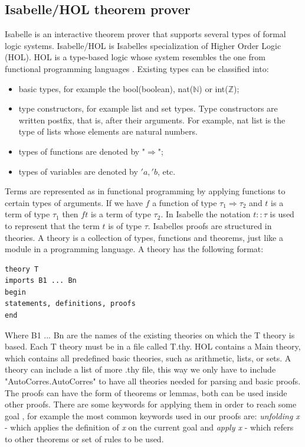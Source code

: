 \documentclass[conference]{IEEEtran}
\begin{document}
\subsection{Isabelle/HOL theorem prover}
Isabelle is an interactive theorem prover that supports several types of formal logic systems. Isabelle/HOL is Isabelle\textquotesingle s specialization of Higher Order Logic (HOL). HOL is a type-based logic whose system resembles the one from functional programming languages \cite{funcprog}. Existing types can be classified \cite{sel4} into:
\begin{itemize}
    \item basic types, for example the bool(boolean), nat($\mathbb{N}$) or int($\mathbb{Z}$);
    \item type constructors, for example list and set types. Type constructors are written postfix, that is, after their arguments. For example, nat list is the type of lists whose elements are natural numbers.
    \item types of functions are denoted by "$\Rightarrow$";
    \item types of variables are denoted by $'a, 'b$, etc.
\end{itemize}
Terms are represented as in functional programming by applying functions to certain types of arguments. If we have $f$ a function of type $\tau_1 \Rightarrow \tau_2$ and $t$ is a term of type $\tau_1$ then $f t$ is a term of type $\tau_2$. In Isabelle the notation $t::\tau$ is used to represent that the term $t$ is of type $\tau$.
Isabelle\textquotesingle s proofs are structured in theories. A theory is a collection of types, functions and theorems, just like a module in a programming language. A theory has the following format:
\begin{lstlisting}
theory T
imports B1 ... Bn
begin
statements, definitions, proofs
end
\end{lstlisting}
Where B1 ... Bn are the names of the existing theories on which the T theory is based. Each T theory must be in a file called T.thy. HOL contains a Main theory, which contains all predefined basic theories, such as arithmetic, lists, or sets. A theory can include a list of more .thy file, this way we only have to include  "AutoCorres.AutoCorres" to have all theories needed for parsing and basic proofs.\\
The proofs can have the form of theorems or lemmas, both can be used inside other proofs. There are some keywords for applying them in order to reach some goal \cite{isabelle}, for example the most common keywords used in our proofs are: \textit{unfolding x} - which applies the definition of \textit{x} on the current goal and \textit{apply x} - which refers to other theorems or set of rules to be used.
\end{document}
